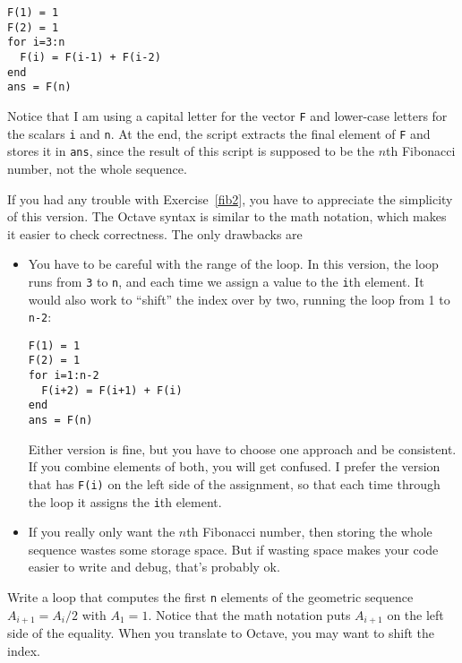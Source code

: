 \begin{verbatim}
F(1) = 1
F(2) = 1
for i=3:n
  F(i) = F(i-1) + F(i-2)
end
ans = F(n)
\end{verbatim}

Notice that I am using a capital letter for the vector {\tt F}
and lower-case letters for the scalars {\tt i} and {\tt n}.
At the end, the script extracts the final element of {\tt F} and
stores it in {\tt ans}, since the result of this script is supposed
to be the $n$th Fibonacci number, not the whole sequence.

If you had any trouble with Exercise~\ref{fib2}, you have to
appreciate the simplicity of this version. The Octave syntax is
similar to the math notation, which makes it easier to check
correctness. The only drawbacks are

\begin{itemize}

\item You have to be careful with the range of the
loop. In this version, the loop runs from {\tt 3} to {\tt n},
and each time we assign a value to the {\tt i}th element. It
would also work to ``shift'' the index over by two,
running the loop from 1 to {\tt n-2}:

\begin{verbatim}
F(1) = 1
F(2) = 1
for i=1:n-2
  F(i+2) = F(i+1) + F(i)
end
ans = F(n)
\end{verbatim}

Either version is fine, but you have to choose one approach
and be consistent. If you combine elements of both, you will
get confused. I prefer the version that has {\tt F(i)} on the
left side of the assignment, so that each time through the loop
it assigns the {\tt i}th element.

\item If you really only want the $n$th Fibonacci number, then storing
the whole sequence wastes some storage space. But if wasting space
makes your code easier to write and debug, that's probably ok.

\end{itemize}

\begin{ex}
Write a loop that computes the first {\tt n} elements
of the geometric sequence $A_{i+1} = A_i/2$ with $A_1 = 1$. Notice that
the math notation puts $A_{i+1}$ on the left side of the equality.
When you translate to Octave, you may want to shift the index.
\end{ex}


